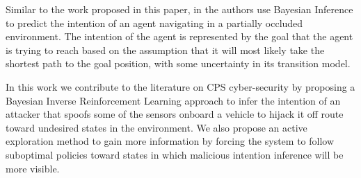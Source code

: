 \documentclass[letterpaper, 10 pt, conference]{ieeeconf}  %
\begin{document}

Similar to the work proposed in this paper, in \cite{best2015bayesian} the authors use Bayesian Inference to predict the intention of an agent navigating in a partially occluded environment. The intention of the agent is represented by the goal that the agent is trying to reach based on the assumption that it will most likely take the shortest path to the goal position, with some uncertainty in its transition model.

In this work we contribute to the literature on CPS cyber-security by proposing a Bayesian Inverse Reinforcement Learning approach to infer the intention of an attacker that spoofs some of the sensors onboard a vehicle to hijack it off route toward undesired states in the environment. We also propose an active exploration method to gain more information by forcing the system to follow suboptimal policies toward states in which malicious intention inference will be more visible.
%
\end{document}
